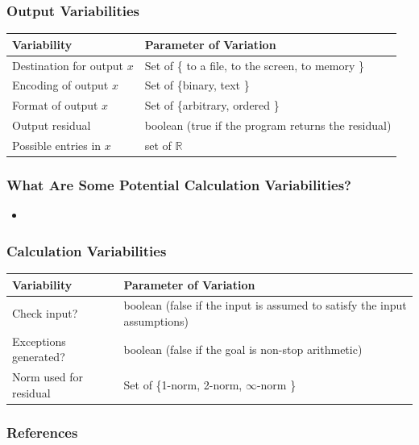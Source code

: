 \documentclass[t,12pt,numbers,fleqn]{beamer}
\newcommand{\colA}{2.1cm}
\newcommand{\colB}{6.9cm}
\begin{document}
\begin{frame}
\frametitle{Output Variabilities}

\begin{table}
\begin{tabular}{| p{\colA} | p{\colB} | }
\hline
\textbf{Variability} & \textbf{Parameter of Variation} \\
\hline
Destination for output $x$ & Set of \{ to a file, to the screen, to memory \} \\
\hline
Encoding of output $x$ & Set of \{binary, text \} \\
\hline
Format of output $x$ & Set of \{arbitrary, ordered \} \\
\hline
Output residual & boolean (true if the program returns the residual) \\
\hline
Possible entries in $x$ & set of $\mathbb{R}$ \\
\hline
\end{tabular}
\end{table}

\end{frame}


\begin{frame}
\frametitle{What Are Some Potential Calculation Variabilities?}

\begin{itemize}
	
\item {}
    
\end{itemize}

\end{frame}


\begin{frame}
\frametitle{Calculation Variabilities}

\begin{table}
\begin{tabular}{| p{\colA} | p{\colB} | }
\hline
\textbf{Variability} & \textbf{Parameter of Variation} \\
\hline
Check input? & boolean (false if the input is assumed to satisfy the input assumptions)\\ 
\hline
Exceptions generated? & boolean (false if the goal is non-stop arithmetic)\\ 
\hline
Norm used for residual & Set of \{1-norm, 2-norm, $\infty$-norm \} \\
\hline
\end{tabular}
\end{table}

\end{frame}


\begin{frame}[allowframebreaks]
\frametitle{References}



\end{frame}

\end{document}
